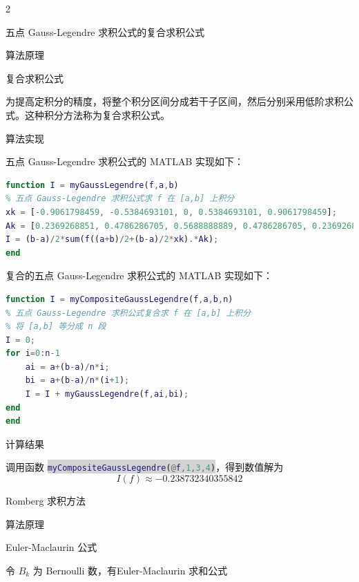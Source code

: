 \documentclass[a4paper]{article}
\newcommand{\inlinecode}[2]{\colorbox{lightgray}{\lstinline[language=#1]$#2$}}
\begin{document}
\begin{multicols}{2}
\begin{section}{五点 Gauss-Legendre 求积公式的复合求积公式}
\begin{subsection}{算法原理}
		\begin{subsubsection}{复合求积公式}
		
			为提高定积分的精度，将整个积分区间分成若干子区间，然后分别采用低阶求积公式。这种积分方法称为复合求积公式。
			
		\end{subsubsection}
		
	\end{subsection}

	\begin{subsection}{算法实现}
		
		五点 Gauss-Legendre 求积公式的 MATLAB 实现如下：
		
\begin{lstlisting}[language=Matlab]
function I = myGaussLegendre(f,a,b)
% 五点 Gauss-Legendre 求积公式求 f 在 [a,b] 上积分
xk = [-0.9061798459, -0.5384693101, 0, 0.5384693101, 0.9061798459];
Ak = [0.2369268851, 0.4786286705, 0.5688888889, 0.4786286705, 0.2369268851];
I = (b-a)/2*sum(f((a+b)/2+(b-a)/2*xk).*Ak);
end
\end{lstlisting}

		复合的五点 Gauss-Legendre 求积公式的 MATLAB 实现如下：
		
\begin{lstlisting}[language=Matlab]
function I = myCompositeGaussLegendre(f,a,b,n)
% 五点 Gauss-Legendre 求积公式复合求 f 在 [a,b] 上积分
% 将 [a,b] 等分成 n 段
I = 0;
for i=0:n-1
    ai = a+(b-a)/n*i;
    bi = a+(b-a)/n*(i+1);
    I = I + myGaussLegendre(f,ai,bi);
end
end
\end{lstlisting}

		
	\end{subsection}
	
	\begin{subsection}{计算结果}
	
		调用函数 \inlinecode{Matlab}{myCompositeGaussLegendre(@f,1,3,4)}，得到数值解为 $$I(f)\approx -0.238732340355842$$
		
	\end{subsection}
	
\end{section}

\begin{section}{Romberg 求积方法}

	\begin{subsection}{算法原理}
		
		\begin{subsubsection}{Euler-Maclaurin 公式}
			
			令 $B_k$ 为 Bernoulli 数，有Euler-Maclaurin 求和公式 
			

\end{subsubsection}
\end{subsection}
\end{section}
\end{multicols}
\end{document}
